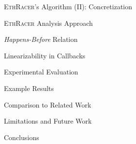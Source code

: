 \documentclass[9pt]{beamer}
\begin{document}
%
\begin{frame}{\textsc{EthRacer}'s Algorithm (II): Concretization}
\end{frame}
%
\begin{frame}{\textsc{EthRacer} Analysis Approach}
\end{frame}
%
\begin{frame}{\textit{Happens-Before} Relation}
\end{frame}
%
\begin{frame}{Linearizability in Callbacks}
\end{frame}
%
\begin{frame}{Experimental Evaluation}
\end{frame}
%
\begin{frame}{Example Results}
\end{frame}
%
\begin{frame}{Comparison to Related Work}
\end{frame}
%
\begin{frame}{Limitations and Future Work}
\end{frame}
%
\begin{frame}{Conclusions}
\end{frame}
%
\begin{frame}{}
  \centering\huge\sffamily
  \textbf{}
\end{frame}
%
\begin{frame}[allowframebreaks]{}
  \scriptsize
  
  
\end{frame}
%
\end{document}
